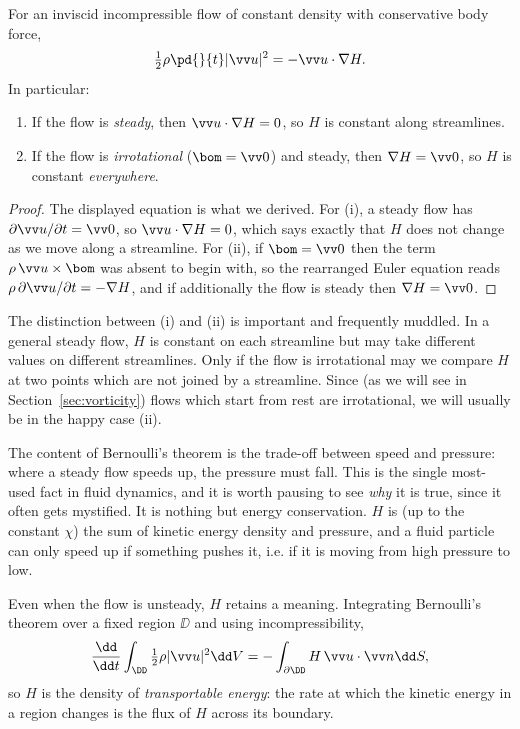 \begin{theorem}
	For an inviscid incompressible flow of constant density with conservative body force,
	$$
	\tfrac{1}{2}\rho\pd{}{t}|\vv u|^2 = - \vv u \cdot \nabla H.
	$$
	In particular:
	\begin{enumerate}[label=(\roman*)]
		\item If the flow is \emph{steady}, then $\vv u \cdot \nabla H = 0$, so $H$ is constant along streamlines.
		\item If the flow is \emph{irrotational} ($\bom = \vv 0$) and steady, then $\nabla H = \vv 0$, so $H$ is constant \emph{everywhere}.
	\end{enumerate}
\end{theorem}
\begin{proof}
	The displayed equation is what we derived. For (i), a steady flow has $\partial \vv u/\partial t = \vv 0$, so $\vv u \cdot \nabla H = 0$, which says exactly that $H$ does not change as we move along a streamline. For (ii), if $\bom = \vv 0$ then the term $\rho \, \vv u \times \bom$ was absent to begin with, so the rearranged Euler equation reads $\rho \, \partial\vv u/\partial t = -\nabla H$, and if additionally the flow is steady then $\nabla H = \vv 0$. \qedhere
\end{proof}

The distinction between (i) and (ii) is important and frequently muddled. In a general steady flow, $H$ is constant on each streamline but may take different values on different streamlines. Only if the flow is irrotational may we compare $H$ at two points which are not joined by a streamline. Since (as we will see in Section~\ref{sec:vorticity}) flows which start from rest are irrotational, we will usually be in the happy case (ii).

The content of Bernoulli's theorem is the trade-off between speed and pressure: where a steady flow speeds up, the pressure must fall. This is the single most-used fact in fluid dynamics, and it is worth pausing to see \emph{why} it is true, since it often gets mystified. It is nothing but energy conservation. $H$ is (up to the constant $\chi$) the sum of kinetic energy density and pressure, and a fluid particle can only speed up if something pushes it, i.e. if it is moving from high pressure to low.

\begin{remark}
	Even when the flow is unsteady, $H$ retains a meaning. Integrating Bernoulli's theorem over a fixed region $\DD$ and using incompressibility,
	$$
	\frac{\dd}{\dd t}\int_\DD \tfrac{1}{2}\rho|\vv u|^2 \dd V = -\int_{\partial \DD} H \, \vv u \cdot \vv n \dd S,
	$$
	so $H$ is the density of \emph{transportable energy}: the rate at which the kinetic energy in a region changes is the flux of $H$ across its boundary.
\end{remark}

